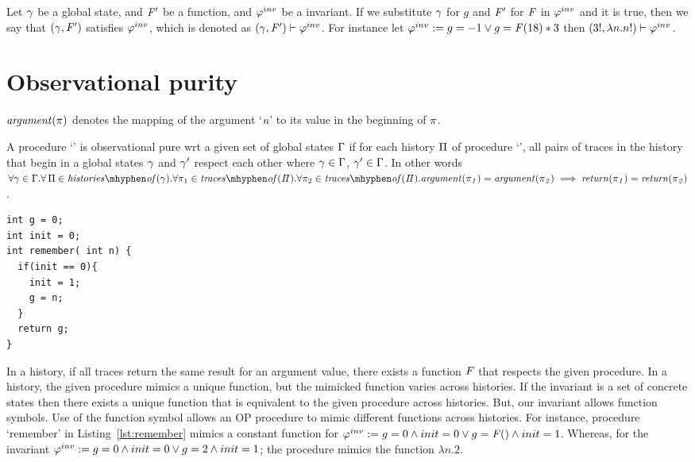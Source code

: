 Let $\gamma$ be a global state, and $\mathit{F}'$ be a function, and $\varphi^{inv}$
be a invariant. If we substitute $\gamma$ for $g$ and $\mathit{F}'$ for $\mathit{F}$
in $\varphi^{inv}$ and it is true, then we say that $(\gamma, \mathit{F}')$ satisfies
$\varphi^{inv}$, which is denoted as $(\gamma, \mathit{F}') \vdash \varphi^{inv}$. For
instance let $\varphi^{inv} := g = -1 \vee g = \mathit{F}(18) * 3$ then $(3!, \lambda
n. n!) \vdash \varphi^{inv}$.

\section{Observational purity}\label{sec:op}

\begin{definition}
  $\mathit{argument(\pi)}$ denotes the mapping of the argument `$\textit{n}$' to its
  value in the beginning of $\pi$.
\end{definition}


\begin{definition}
  A procedure `\foo' is observational pure wrt a given set of global
  states $\Gamma$ if for each history $\Pi$ of procedure
  `\foo', all pairs of traces in the history that begin in a global
  states $\gamma$ and $\gamma'$ respect each other where $\gamma
  \in \Gamma$, $\gamma' \in \Gamma$.  In other words
  $\forall \gstate \in \Gstates.\forall \, \history \in
  \historyOf{\gstate}. \forall \trace_1 \in
  \tracesOf{\history}. \forall \trace_2 \in
  \tracesOf{\history}.\\ \param{\trace_1} = \param{\trace_2} \implies
  \return{\trace_1} = \return{\trace_2}$.
\end{definition}

\begin{lstlisting}[caption={Procedure `remember' : always returns the
      argument from its first call}, label=lst:remember]
int g = 0;
int init = 0;
int remember( int n) {
  if(init == 0){
    init = 1;
    g = n;
  }
  return g;
}
\end{lstlisting}

In a history, if all traces return the same result for an argument
value, there exists a function $\mathit{F}$ that respects the given
procedure. In a history, the given procedure mimics a unique function,
but the mimicked function varies across histories. If the invariant is
a set of concrete states then there exists a unique function that is
equivalent to the given procedure across histories. But, our invariant
allows function symbols. Use of the function symbol allows an OP
procedure to mimic different functions across histories. For instance,
procedure `remember' in Listing~\ref{lst:remember} mimics a constant
function for $\varphi^{inv} := g=0 \wedge init=0 \vee g= \mathit{F}() \wedge
init=1$. Whereas, for the invariant $\varphi^{inv} := g=0 \wedge init=0 \vee
g=2 \wedge init=1$; the procedure mimics the function $\lambda n.2$.
